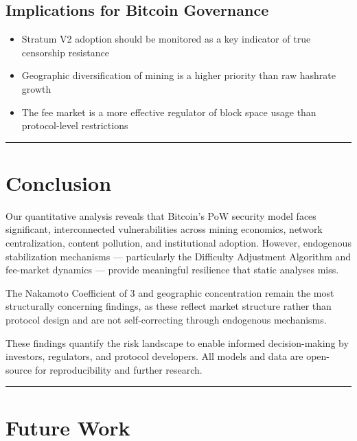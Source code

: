 \documentclass[
  11pt,
]{article}
\providecommand{\tightlist}{%
  \setlength{\itemsep}{0pt}\setlength{\parskip}{0pt}}\usepackage{longtable,booktabs,array}
\let\oldsection\section
\renewcommand{\section}[1]{\FloatBarrier\oldsection{#1}}
\let\oldsubsection\subsection
\renewcommand{\subsection}[1]{\FloatBarrier\oldsubsection{#1}}
\begin{document}
\hypertarget{implications-for-bitcoin-governance}{%
\subsection{Implications for Bitcoin
Governance}\label{implications-for-bitcoin-governance}}

\begin{itemize}
\tightlist
\item
  Stratum V2 adoption should be monitored as a key indicator of true
  censorship resistance
\item
  Geographic diversification of mining is a higher priority than raw
  hashrate growth
\item
  The fee market is a more effective regulator of block space usage than
  protocol-level restrictions
\end{itemize}

\begin{center}\rule{0.5\linewidth}{0.5pt}\end{center}

\hypertarget{conclusion}{%
\section{Conclusion}\label{conclusion}}

Our quantitative analysis reveals that Bitcoin's PoW security model
faces significant, interconnected vulnerabilities across mining
economics, network centralization, content pollution, and institutional
adoption. However, endogenous stabilization mechanisms --- particularly
the Difficulty Adjustment Algorithm and fee-market dynamics --- provide
meaningful resilience that static analyses miss.

The Nakamoto Coefficient of 3 and geographic concentration remain the
most structurally concerning findings, as these reflect market structure
rather than protocol design and are not self-correcting through
endogenous mechanisms.

These findings quantify the risk landscape to enable informed
decision-making by investors, regulators, and protocol developers. All
models and data are open-source for reproducibility and further
research.

\begin{center}\rule{0.5\linewidth}{0.5pt}\end{center}

\hypertarget{future-work}{%
\section{Future Work}\label{future-work}}
\end{document}
